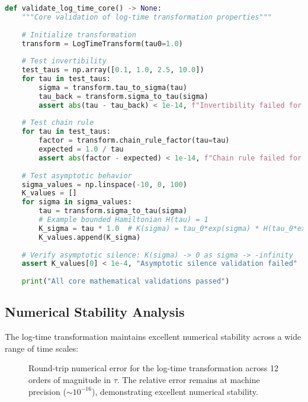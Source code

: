 \documentclass[11pt,a4paper]{article}
\begin{document}
\begin{lstlisting}[language=Python, caption=Mathematical Validation Suite]
def validate_log_time_core() -> None:
    """Core validation of log-time transformation properties"""
    
    # Initialize transformation
    transform = LogTimeTransform(tau0=1.0)
    
    # Test invertibility
    test_taus = np.array([0.1, 1.0, 2.5, 10.0])
    for tau in test_taus:
        sigma = transform.tau_to_sigma(tau)
        tau_back = transform.sigma_to_tau(sigma)
        assert abs(tau - tau_back) < 1e-14, f"Invertibility failed for tau={tau}"
    
    # Test chain rule
    for tau in test_taus:
        factor = transform.chain_rule_factor(tau=tau)
        expected = 1.0 / tau
        assert abs(factor - expected) < 1e-14, f"Chain rule failed for tau={tau}"
    
    # Test asymptotic behavior
    sigma_values = np.linspace(-10, 0, 100)
    K_values = []
    for sigma in sigma_values:
        tau = transform.sigma_to_tau(sigma)
        # Example bounded Hamiltonian H(tau) = 1
        K_sigma = tau * 1.0  # K(sigma) = tau_0*exp(sigma) * H(tau_0*exp(sigma))
        K_values.append(K_sigma)
    
    # Verify asymptotic silence: K(sigma) -> 0 as sigma -> -infinity
    assert K_values[0] < 1e-4, "Asymptotic silence validation failed"
    
    print("All core mathematical validations passed")
\end{lstlisting}

\subsection{Numerical Stability Analysis}

The log-time transformation maintains excellent numerical stability across a wide range of time scales:

\begin{figure}[h]
\centering
{}
\caption{Round-trip numerical error for the log-time transformation across 12 orders of magnitude in $\tau$. The relative error remains at machine precision ($\sim 10^{-16}$), demonstrating excellent numerical stability.}
\end{figure}
\end{document}
